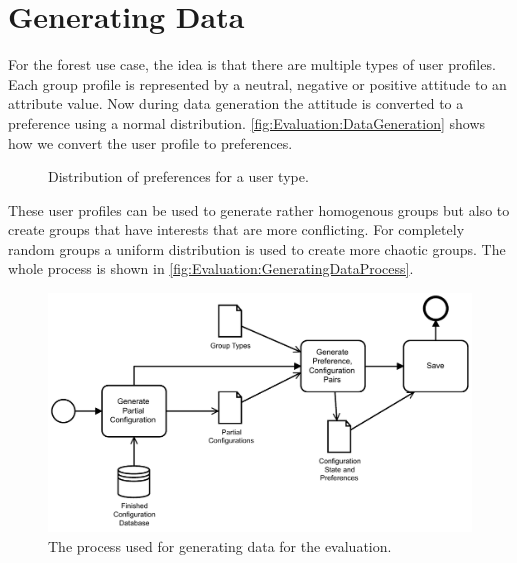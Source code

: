 \section{Generating Data}
\label{sec:Evaluation:GeneratingGroups}

For the forest use case, the idea is that there are multiple types of user profiles. Each group profile is represented by a neutral, negative or positive attitude to an attribute value. Now during data generation the attitude is converted to a preference using a normal distribution. \autoref{fig:Evaluation:DataGeneration} shows how we convert the user profile to preferences.

\pgfplotsset{height=5cm,width=\textwidth,compat=1.8}
\begin{figure}
 \caption{Distribution of preferences for a user type.}
\label{fig:Evaluation:DataGeneration}
\end{figure}

These user profiles can be used to generate rather homogenous groups but also to create groups that have interests that are more conflicting. For completely random groups a uniform distribution is used to create more chaotic groups. The whole process is shown in \autoref{fig:Evaluation:GeneratingDataProcess}.



\begin{figure}
    \centering
    \includegraphics[width=1\textwidth]{./figures/bpmn_evaluation_input_data_generation.pdf}
    \caption{The process used for generating data for the evaluation.}
    \label{fig:Evaluation:GeneratingDataProcess}
\end{figure}